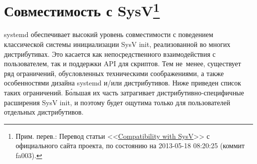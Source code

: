 \documentclass[10pt,oneside,a4paper]{article}
\newcommand{\sfnote}[1]{\texorpdfstring{\protect\footnote%
	{Прим. перев.: #1}}{}}
\begin{document}
\section{Совместимость с SysV\sfnote{Перевод статьи
<<\href{http://www.freedesktop.org/wiki/Software/systemd/Incompatibilities}%
{Compatibility with SysV}>> с официального сайта проекта, по
состоянию на 2013-05-18 08:20:25 (коммит fa003).}}

systemd обеспечивает высокий уровень совместимости с поведением классической
системы инициализации SysV init, реализованной во многих дистрибутивах.  Это
касается как непосредственного взаимодействия с пользователем, так и поддержки
API для скриптов. Тем не~менее, существует ряд ограничений, обусловленных
техническими соображениями, а также особенностями дизайна systemd и/или
дистрибутивов. Ниже приведен список таких ограничений. Б\'{о}льшая их часть
затрагивает дистрибутивно-специфичные расширения SysV init, и поэтому будет
ощутима только для пользователей отдельных дистрибутивов.
\end{document}
